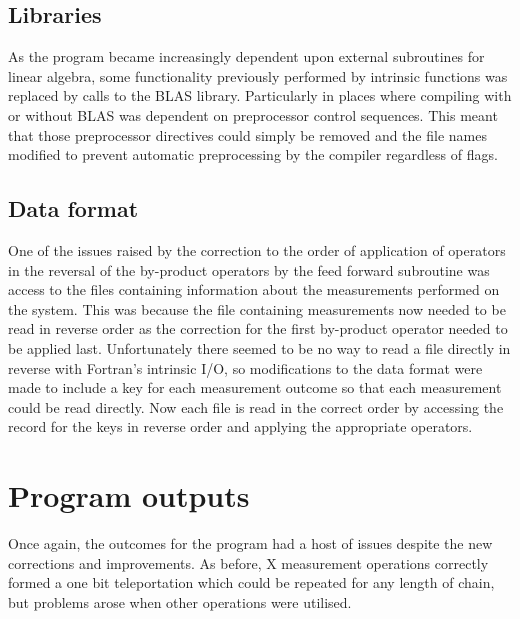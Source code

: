 
\subsection{Libraries}

As the program became increasingly dependent upon external subroutines for linear algebra, some functionality previously performed by intrinsic functions was replaced by calls to the BLAS library. Particularly in places where compiling with or without BLAS was dependent on preprocessor control sequences. This meant that those preprocessor directives could simply be removed and the file names modified to prevent automatic preprocessing by the compiler regardless of flags.


\subsection{Data format}
\label{subsec:data_form}


One of the issues raised by the correction to the order of application of operators in the reversal of the by-product operators by the feed forward subroutine was access to the files containing information about the measurements performed on the system. This was because the file containing measurements now needed to be read in reverse order as the correction for the first by-product operator needed to be applied last. Unfortunately there seemed to be no way to read a file directly in reverse with Fortran's intrinsic I/O, so modifications to the data format were made to include a key for each measurement outcome so that each measurement could be read directly. Now each file is read in the correct order by accessing the record for the keys in reverse order and applying the appropriate operators.


\section{Program outputs}

Once again, the outcomes for the program had a host of issues despite the new corrections and improvements. As before, X measurement operations correctly formed a one bit teleportation which could be repeated for any length of chain, but problems arose when other operations were utilised. 

